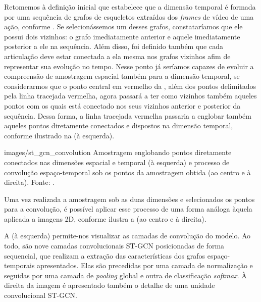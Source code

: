 Retomemos à definição inicial que estabelece que a dimensão temporal é formada por uma sequência de grafos de esqueletos extraídos dos \textit{frames} de vídeo de uma ação, conforme . Se selecionássemos um desses grafos, constataríamos que ele possui dois vizinhos: o grafo imediatamente anterior e aquele imediatamente posterior a ele na sequência. Além disso, foi definido também que cada articulação deve estar conectada a ela mesma nos grafos vizinhos afim de representar sua evolução no tempo. Nesse ponto já seríamos capazes de evoluir a compreensão de amostragem espacial também para a dimensão temporal, se considerarmos que o ponto central em vermelho da , além dos pontos delimitados pela linha tracejada vermelha, agora passará a ter como vizinhos também aqueles pontos com os quais está conectado nos seus vizinhos anterior e posterior da sequência. Dessa forma, a linha tracejada vermelha passaria a englobar também aqueles pontos diretamente conectados e dispostos na dimensão temporal, conforme ilustrado na  (à esquerda).

    {images/st_gcn_convolution}
    {Amostragem englobando pontos diretamente conectados nas dimensões espacial e temporal (à esquerda) e processo de convolução espaço-temporal sob os pontos da amostragem obtida (ao centro e à direita).  Fonte: \cite[p. 3]{st-gcn-2018}.}

Uma vez realizada a amostragem sob as duas dimensões e selecionados os pontos para a convolução, é possível aplicar esse processo de uma forma análoga àquela aplicada a imagens 2D, conforme ilustra a  (ao centro e à direita).



A  (à esquerda) permite-nos visualizar as camadas de convolução do modelo. Ao todo, são nove camadas convolucionais ST-GCN posicionadas de forma sequencial, que realizam a extração das características dos grafos espaço-temporais apresentados. Elas são precedidas por uma camada de normalização e seguidas por uma camada de \textit{pooling} global e outra de classificação \textit{softmax}. À direita da imagem é apresentado também o detalhe de uma unidade convolucional ST-GCN.

